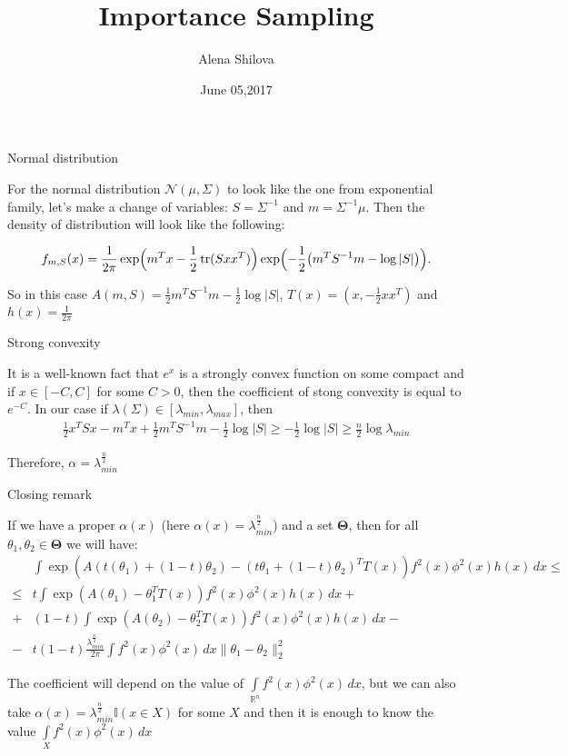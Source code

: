 \documentclass[10pt]{beamer}
\title{Importance Sampling}
\author{Alena Shilova}
\date{June 05,2017}
\institute{Skoltech}
\DeclareMathOperator{\tr}{tr}
\begin{document}
\maketitle

\begin{frame}{Normal distribution}

For the normal distribution $\mathcal{N} (\mu, \Sigma)$ to look like the one from exponential family, let's make a change of variables: $S = \Sigma^{-1}$ and $m = \Sigma^{-1} \mu$. Then the density of distribution will look like the following:

\[
f_{m,S}(x) = \frac1{2\pi} \exp \Bigl( m^T x - \frac 12 \tr( Sxx^T ) \Bigr) \exp \Bigl(- \frac 1 2 \bigl( m^TS^{-1}m - \log |S| \bigr) \Bigr).
\]

So in this case $A(m, S) = \frac 12 m^TS^{-1} m - \frac 12 \log |S|$, $T(x) = (x, -\frac 12 xx^T)$ and $h(x) = \frac 1{2\pi}$

\end{frame}

\begin{frame}{Strong convexity}

It is a well-known fact that $e^x$ is a strongly convex function on some compact and if $x \in [-C, C]$ for some $C > 0$, then the coefficient of stong convexity is equal to $e^{-C}$. In our case if $\lambda(\Sigma) \in [\lambda_{min}, \lambda_{max}]$, then
\begin{align*}
    \frac 12 x^T Sx - m^Tx + \frac 12 m^TS^{-1}m - \frac 12 \log|S| \geq -\frac 12 \log |S| \geq \frac n2 \log \lambda_{min}
\end{align*}

Therefore, $\alpha = \lambda_{min}^{\frac n2}$

\end{frame}

\begin{frame}{Closing remark}

If we have a proper $\alpha(x)$ (here $\alpha(x) = \lambda_{min}^{\frac n2}$) and a set $\mathbf{\Theta}$, then for all $\theta_1, \theta_2 \in \mathbf{\Theta}$ we will have:
\begin{align*}
&\int \exp(A(t(\theta_1) + (1-t)\theta_2) - (t\theta_1 + (1-t)\theta_2)^TT(x))f^2(x)\phi^2(x)h(x)\, d x  \leq\\
\leq &t \int \exp(A(\theta_1) - \theta_1^TT(x))f^2(x)\phi^2(x)h(x)\, d x +\\
+&(1-t) \int \exp(A(\theta_2) - \theta_2^TT(x))f^2(x)\phi^2(x)h(x)\, d x -\\
-&t(1-t) \frac{\lambda_{min}^{\frac n2}}{2\pi} \int f^2(x)\phi^2(x)\, dx \|\theta_1 - \theta_2\|^2_2
\end{align*}

The coefficient will depend on the value of $\int \limits_{\mathbb{R}^n} f^2(x)\phi^2(x)\, dx$, but we can also take $\alpha(x) = \lambda_{min}^{\frac n2} \mathbb{I}(x \in X)$ for some $X$ and then it is enough to know the value $\int \limits_X f^2(x)\phi^2(x)\, dx$

\end{frame}
\end{document}
